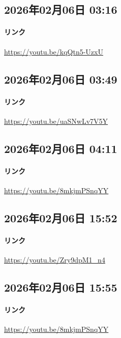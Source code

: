 \subsection*{2026年02月06日 03:16}

\paragraph{リンク}
\url{https://youtu.be/kqQtn5-UzxU}

\subsection*{2026年02月06日 03:49}

\paragraph{リンク}
\url{https://youtu.be/uaSNwLv7V5Y}

\subsection*{2026年02月06日 04:11}

\paragraph{リンク}
\url{https://youtu.be/8mkjmPSnqYY}

\subsection*{2026年02月06日 15:52}

\paragraph{リンク}
\url{https://youtu.be/Zry9dpM1_n4}

\subsection*{2026年02月06日 15:55}

\paragraph{リンク}
\url{https://youtu.be/8mkjmPSnqYY}


